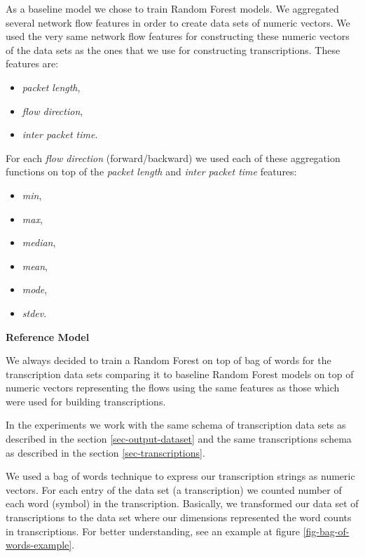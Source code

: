 \documentclass{article}
\begin{document}
As a baseline model we chose to train Random Forest models. We aggregated several network flow features in order to create data sets of numeric vectors. We used the very same network flow features for constructing these numeric vectors of the data sets as the ones that we use for constructing transcriptions. These features are:

\begin{itemize}
    \item \textit{packet length},
    \item \textit{flow direction},
    \item \textit{inter packet time}.
\end{itemize}

\noindent For each \textit{flow direction} (forward/backward) we used each of these aggregation functions on top of the \textit{packet length} and \textit{inter packet time} features:

\begin{itemize}
    \item \textit{min},
    \item \textit{max},
    \item \textit{median},
    \item \textit{mean},
    \item \textit{mode},
    \item \textit{stdev}.
\end{itemize}

\vspace{0.5cm}


\noindent\textbf{Reference Model}

We always decided to train a Random Forest on top of bag of words for the transcription data sets comparing it to baseline Random Forest models on top of numeric vectors representing the flows using the same features as those which were used for building transcriptions.

In the experiments we work with the same schema of transcription data sets as described in the section \ref{sec-output-dataset} and the same transcriptions schema as described in the section \ref{sec-transcriptions}.

We used a bag of words technique to express our transcription strings as numeric vectors. For each entry of the data set (a transcription) we counted number of each word (symbol) in the transcription. Basically, we transformed our data set of transcriptions to the data set where our dimensions represented the word counts in transcriptions. For better understanding, see an example at figure \ref{fig-bag-of-words-example}.
\end{document}
